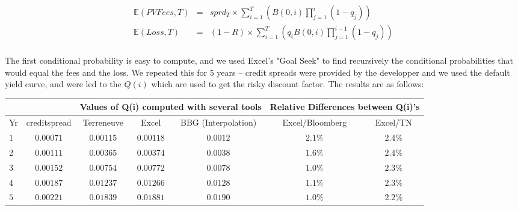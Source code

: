 \begin{eqnarray*}
    \mathbb{E}(PVFees,T)&=&sprd_T\times\sum_{i=1}^T\left(B(0,i)\prod_{j=1}^i(1-q_j)\right)\\
    \mathbb{E}(Loss,T)&=&(1-R)\times\sum_{i=1}^T\left(q_iB(0,i)\prod_{j=1}^{i-1}(1-q_{j})\right)\\
\end{eqnarray*}

The first conditional probability is easy to compute, and we used Excel's "Goal Seek" to find recursively the conditional probabilities that would equal the fees and the loss. We repeated this for 5 years -- credit spreads were provided by the developper and we used the default yield curve, and were led to the $Q(i)$ which are used to get the risky discount factor. The results are as follows:

\begin{center}
\begin{tabular}{|l|l|l|l|l|l|l|}
\cline{3-7}
\multicolumn{1}{l}{} & \multicolumn{1}{c|}{} & \multicolumn{3}{c|}{Values of Q(i) computed with several tools} & \multicolumn{2}{c|}{Relative Differences between Q(i)'s} \\
\hline
Yr & \multicolumn{1}{c|}{creditspread} & \multicolumn{1}{c|}{Terreneuve} & \multicolumn{1}{c|}{Excel} & \multicolumn{1}{c|}{BBG (Interpolation)} & \multicolumn{1}{c|}{Excel/Bloomberg} & \multicolumn{1}{c|}{ Excel/TN} \\
\hline
$1$ & \multicolumn{1}{c|}{$0.00071$} & \multicolumn{1}{c|}{$0.00115$} & \multicolumn{1}{c|}{$0.00118$} & \multicolumn{1}{c|}{$0.0012$} & \multicolumn{1}{c|}{$2.1\%$} & \multicolumn{1}{c|}{$2.4\%$} \\
\hline
$2$ & \multicolumn{1}{c|}{$0.00111$} & \multicolumn{1}{c|}{$0.00365$} & \multicolumn{1}{c|}{$0.00374$} & \multicolumn{1}{c|}{$0.0038$} & \multicolumn{1}{c|}{$1.6\%$} & \multicolumn{1}{c|}{$2.4\%$} \\
\hline
$3$ & \multicolumn{1}{c|}{$0.00152$} & \multicolumn{1}{c|}{$0.00754$} & \multicolumn{1}{c|}{$0.00772$} & \multicolumn{1}{c|}{$0.0078$} & \multicolumn{1}{c|}{$1.0\%$} & \multicolumn{1}{c|}{$2.3\%$} \\
\hline
$4$ & \multicolumn{1}{c|}{$0.00187$} & \multicolumn{1}{c|}{$0.01237$} & \multicolumn{1}{c|}{$0.01266$} & \multicolumn{1}{c|}{$0.0128$} & \multicolumn{1}{c|}{$1.1\%$} & \multicolumn{1}{c|}{$2.3\%$} \\
\hline
$5$ & \multicolumn{1}{c|}{$0.00221$} & \multicolumn{1}{c|}{$0.01839$} & \multicolumn{1}{c|}{$0.01881$} & \multicolumn{1}{c|}{$0.0190$} & \multicolumn{1}{c|}{$1.0\%$} & \multicolumn{1}{c|}{$2.2\%$} \\
\hline
\end{tabular}
\end{center}

